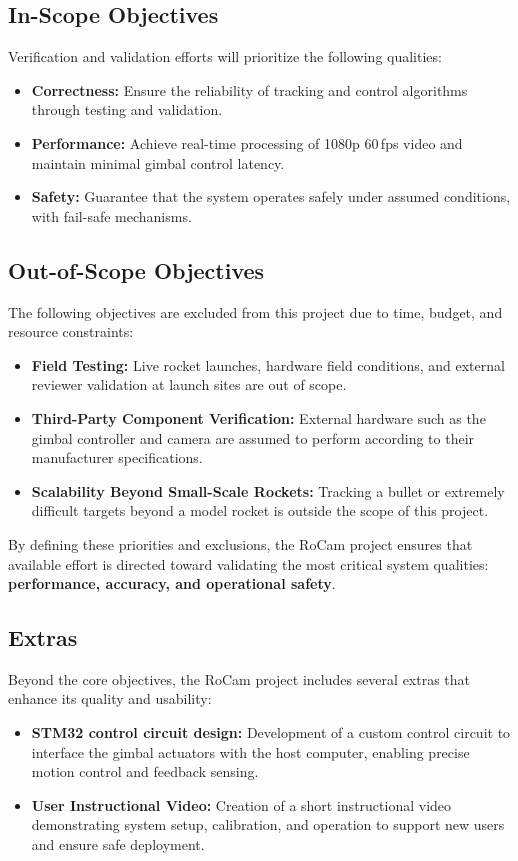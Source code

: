 \documentclass[12pt, titlepage]{article}
\begin{document}
\subsection{In-Scope Objectives}
Verification and validation efforts will prioritize the following qualities:
\begin{itemize}
  \item \textbf{Correctness:} Ensure the reliability of tracking and control
        algorithms through testing and validation.
  \item \textbf{Performance:} Achieve real-time processing of 1080p 60\,fps
        video and maintain minimal gimbal control latency.
  \item \textbf{Safety:} Guarantee that the system operates safely under
        assumed conditions, with fail-safe mechanisms.
\end{itemize}

\subsection{Out-of-Scope Objectives}
The following objectives are excluded from this project due to time, budget,
and resource constraints:
\begin{itemize}
  \item \textbf{Field Testing:} Live rocket launches, hardware field conditions,
        and external reviewer validation at launch sites are out of scope.
  \item \textbf{Third-Party Component Verification:} External hardware such as the
        gimbal controller and camera are assumed to perform according to their
        manufacturer specifications.
  \item \textbf{Scalability Beyond Small-Scale Rockets:} Tracking a
        bullet or extremely difficult
        targets beyond a model rocket is outside the scope of this project.
\end{itemize}

By defining these priorities and exclusions, the RoCam project ensures that
available effort is directed toward validating the most critical system
qualities: \textbf{performance, accuracy, and operational safety}.

\subsection{Extras}

Beyond the core objectives, the RoCam project includes several extras that
enhance its quality and usability:
\begin{itemize}
  \item \textbf{STM32 control circuit design:} Development of a
        custom control circuit to interface the gimbal actuators with
        the host computer, enabling precise motion control and feedback sensing.
  \item \textbf{User Instructional Video:} Creation of a short instructional
        video demonstrating system setup, calibration, and operation to support
        new users and ensure safe deployment.
\end{itemize}
\end{document}
